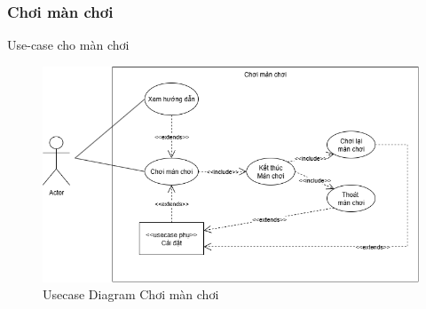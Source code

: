 \subsubsection{Chơi màn chơi}
Use-case cho màn chơi
\begin{figure}[H]
	\centering
	\includegraphics[width=14cm]{Images/PlayLevelUCD.png}
	\vspace{0.5cm}
	\caption{Usecase Diagram Chơi màn chơi}
\end{figure}
